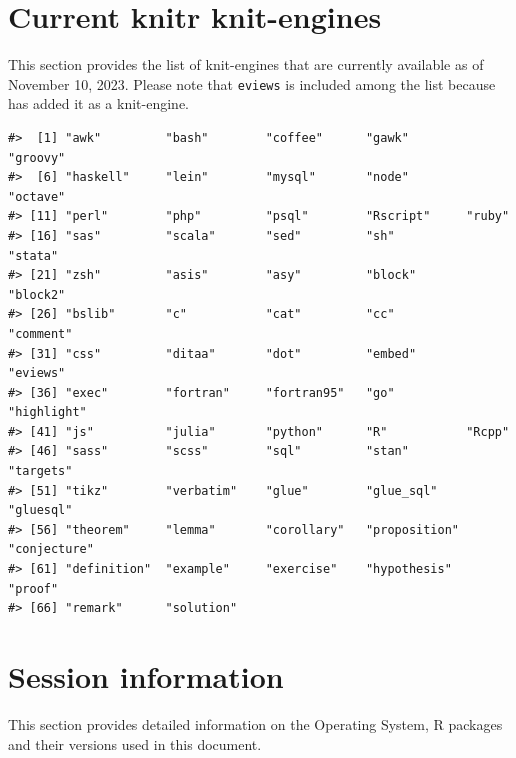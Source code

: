 \hypertarget{current-knitr-knit-engines}{%
\section{Current knitr knit-engines}\label{current-knitr-knit-engines}}

This section provides the list of knit-engines that are currently available as of November 10, 2023. Please note that \texttt{eviews} is included among the list because  has added it as a knit-engine.

\begin{verbatim}
#>  [1] "awk"         "bash"        "coffee"      "gawk"        "groovy"     
#>  [6] "haskell"     "lein"        "mysql"       "node"        "octave"     
#> [11] "perl"        "php"         "psql"        "Rscript"     "ruby"       
#> [16] "sas"         "scala"       "sed"         "sh"          "stata"      
#> [21] "zsh"         "asis"        "asy"         "block"       "block2"     
#> [26] "bslib"       "c"           "cat"         "cc"          "comment"    
#> [31] "css"         "ditaa"       "dot"         "embed"       "eviews"     
#> [36] "exec"        "fortran"     "fortran95"   "go"          "highlight"  
#> [41] "js"          "julia"       "python"      "R"           "Rcpp"       
#> [46] "sass"        "scss"        "sql"         "stan"        "targets"    
#> [51] "tikz"        "verbatim"    "glue"        "glue_sql"    "gluesql"    
#> [56] "theorem"     "lemma"       "corollary"   "proposition" "conjecture" 
#> [61] "definition"  "example"     "exercise"    "hypothesis"  "proof"      
#> [66] "remark"      "solution"
\end{verbatim}

\hypertarget{session-information}{%
\section{Session information}\label{session-information}}

This section provides detailed information on the Operating System, R packages and their versions used in this document.

